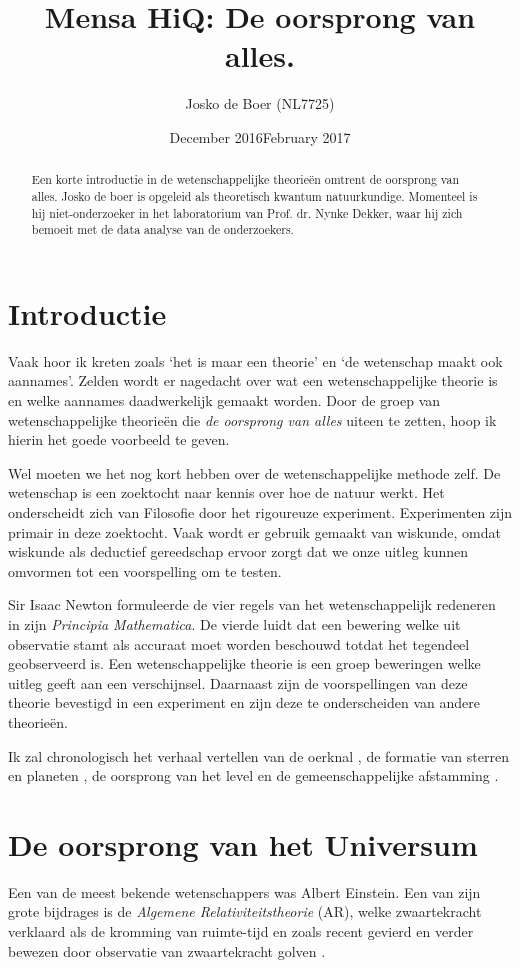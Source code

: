 \documentclass{article}
\title{Mensa HiQ: De oorsprong van alles.}
\author{Josko de Boer (NL7725)}
\date{December 2016}
\date{February 2017}
\begin{document}
\maketitle
\begin{abstract} 
Een korte introductie in de wetenschappelijke theorie\"en omtrent de oorsprong van alles. Josko de boer is opgeleid als theoretisch kwantum natuurkundige. Momenteel is hij niet-onderzoeker in het laboratorium van Prof. dr. Nynke Dekker, waar hij zich bemoeit met de data analyse van de onderzoekers.
\end{abstract} 
    \section{Introductie}
        Vaak hoor ik kreten zoals `het is maar een theorie' en `de wetenschap maakt ook aannames'. Zelden wordt er nagedacht over wat een wetenschappelijke theorie is en welke aannames daadwerkelijk gemaakt worden. Door de groep van wetenschappelijke theorie\"en die \emph{de oorsprong van alles} uiteen te zetten, hoop ik hierin het goede voorbeeld te geven.
        
        Wel moeten we het nog kort hebben over de wetenschappelijke methode zelf. De wetenschap is een zoektocht naar kennis over hoe de natuur werkt. Het onderscheidt zich van Filosofie door het rigoureuze experiment. Experimenten zijn primair in deze zoektocht. Vaak wordt er gebruik gemaakt van wiskunde, omdat wiskunde als deductief gereedschap ervoor zorgt dat we onze uitleg kunnen omvormen tot een voorspelling om te testen.   
        
        Sir Isaac Newton formuleerde de vier regels van het wetenschappelijk redeneren in zijn \emph{Principia Mathematica}. De vierde luidt dat een bewering welke uit observatie stamt als accuraat moet worden beschouwd totdat het tegendeel geobserveerd is. Een wetenschappelijke theorie is een groep beweringen welke uitleg geeft aan een verschijnsel. Daarnaast zijn de voorspellingen van deze theorie bevestigd in een experiment en zijn deze te onderscheiden van andere theorie\"en.
        
        Ik zal chronologisch het verhaal vertellen van de oerknal \cite{oerknal}, de formatie van sterren \cite{ster} en planeten \cite{planeet}, de oorsprong van het level \cite{leven} en de gemeenschappelijke afstamming \cite{afstamming}.
    \section{De oorsprong van het Universum}
        Een van de meest bekende wetenschappers was Albert Einstein. Een van zijn grote bijdrages is de \emph{Algemene Relativiteitstheorie} (AR), welke zwaartekracht verklaard als de kromming van ruimte-tijd en zoals recent gevierd en verder bewezen door observatie van zwaartekracht golven \cite{ligo}. 
        
\end{document}
